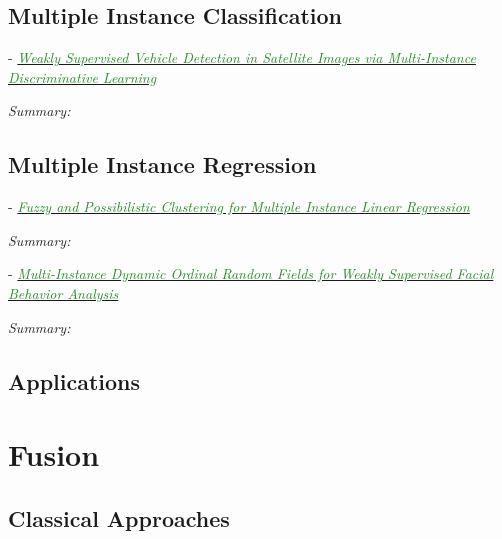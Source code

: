 \documentclass[]{article}
\newcommand{\paperentry}[4]{
            \hangindent=1cm
            \cite{#1} - \href{run:../References/#3}{\textcolor{ForestGreen}{\textit{#2}}}
            
            \noindent            
            \begin{minipage}[t]{0.1\linewidth}\hfill\end{minipage}
            \begin{minipage}[t]{0.8\linewidth}\textcolor{NavyBlue}{{\textit{Summary:}}}#4\end{minipage}
            \vspace{.25cm}
          }
\begin{document}
	
	\subsection{Multiple Instance Classification}
	
		\paperentry{Cao2016VehicleDetectionMIL}
		{Weakly Supervised Vehicle Detection in Satellite Images via Multi-Instance Discriminative Learning}
		{Multiple_Instance_Learning/Cao2016VehicleDetectionMIL.pdf}
		{}
		
	
	\subsection{Multiple Instance Regression}
	
		\paperentry{Trabelsi2018FuzzyClusteringMILRegression}
		{Fuzzy and Possibilistic Clustering for Multiple Instance Linear Regression}
		{Multiple_Instance_Learning/Trabelsi2018FuzzyClusteringMILRegression.pdf}
		{}
		
		\paperentry{Ruiz2018MIDynamicOrdinalRegression}
		{Multi-Instance Dynamic Ordinal Random Fields for Weakly Supervised Facial Behavior Analysis}
		{Multiple_Instance_Learning/Ruiz2018MIDynamicOrdinalRegression.pdf}
		{}
		
%		
%		


	\subsection{Applications}
	
		


\section{Fusion}
	
	\subsection{Classical Approaches}
\end{document}
